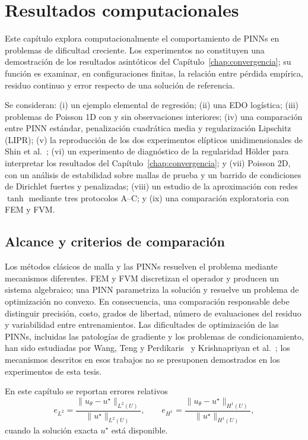 \chapter{Resultados computacionales}
\label{chap:resultados}

Este capítulo explora computacionalmente el comportamiento de PINNs en problemas de dificultad creciente. Los experimentos no constituyen una demostración de los resultados asintóticos del Capítulo~\ref{chap:convergencia}; su función es examinar, en configuraciones finitas, la relación entre pérdida empírica, residuo continuo y error respecto de una solución de referencia.

Se consideran: (i) un ejemplo elemental de regresión; (ii) una EDO logística; (iii) problemas de Poisson 1D con y sin observaciones interiores; (iv) una comparación entre PINN estándar, penalización cuadrática media y regularización Lipschitz (LIPR); (v) la reproducción de los dos experimentos elípticos unidimensionales de Shin et al.~\cite{shin2020convergence}; (vi) un experimento de diagnóstico de la regularidad H\"older para interpretar los resultados del Capítulo~\ref{chap:convergencia}; y (vii) Poisson 2D, con un análisis de estabilidad sobre mallas de prueba y un barrido de condiciones de Dirichlet fuertes y penalizadas; (viii) un estudio de la aproximación con redes $\tanh$ mediante tres protocolos A--C; y (ix) una comparación exploratoria con FEM y FVM.

\section*{Alcance y criterios de comparación}

Los métodos clásicos de malla y las PINNs resuelven el problema mediante mecanismos diferentes. FEM y FVM discretizan el operador y producen un sistema algebraico; una PINN parametriza la solución y resuelve un problema de optimización no convexo. En consecuencia, una comparación responsable debe distinguir precisión, costo, grados de libertad, número de evaluaciones del residuo y variabilidad entre entrenamientos. Las dificultades de optimización de las PINNs, incluidas las patologías de gradiente y los problemas de condicionamiento, han sido estudiadas por Wang, Teng y Perdikaris~\cite{wang2021gradient} y Krishnapriyan et al.~\cite{krishnapriyan2021failure}; los mecanismos descritos en esos trabajos no se presuponen demostrados en los experimentos de esta tesis.

En este capítulo se reportan errores relativos
\[
e_{L^2}
=
\frac{\|u_\theta-u^\star\|_{L^2(U)}}{\|u^\star\|_{L^2(U)}},
\qquad
e_{H^1}
=
\frac{\|u_\theta-u^\star\|_{H^1(U)}}{\|u^\star\|_{H^1(U)}},
\]
cuando la solución exacta $u^\star$ está disponible. 

